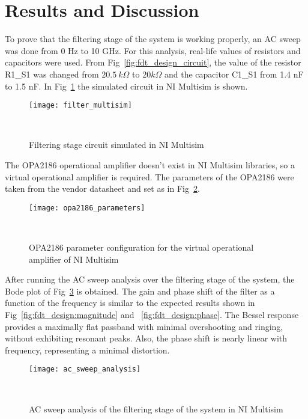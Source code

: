 \section{Results and Discussion}
\label{sec:results_and_discussion}
\hspace{8pt}
To prove that the filtering stage of the system is working properly, an AC sweep was done from 0 Hz to 10 GHz. For this analysis, real-life values of resistors and capacitors were used. From Fig~\ref{fig:fdt_design_circuit}, the value of the resistor R1\_S1 was changed from $20.5~k\Omega$ to $20 k\Omega$ and the capacitor C1\_S1 from 1.4 nF to 1.5 nF. In Fig~\ref{fig:filter_multisim} the simulated circuit in NI Multisim is shown.

\begin{figure}[H]
    \centering
    \texttt{[image: filter\_multisim]}
    \caption{Filtering stage circuit simulated in NI Multisim}
~\label{fig:filter_multisim}
\end{figure}

The OPA2186 operational amplifier doesn't exist in NI Multisim libraries, so a virtual operational amplifier is required. The parameters of the OPA2186 were taken from the vendor datasheet and set as in Fig~\ref{fig:opa2186_parameters}.

\begin{figure}[H]
    \centering
    \texttt{[image: opa2186\_parameters]}
    \caption{OPA2186 parameter configuration for the virtual operational amplifier of NI Multisim}
~\label{fig:opa2186_parameters}
\end{figure}

After running the AC sweep analysis over the filtering stage of the system, the Bode plot of Fig~\ref{fig:ac_sweep_analysis} is obtained. The gain and phase shift of the filter as a function of the frequency is similar to the expected results shown in Fig~\ref{fig:fdt_design:magnitude} and ~\ref{fig:fdt_design:phase}. The Bessel response provides a maximally flat passband with minimal overshooting and ringing, without exhibiting resonant peaks. Also, the phase shift is nearly linear with frequency, representing a minimal distortion.

\begin{figure}[H]
    \centering
    \texttt{[image: ac\_sweep\_analysis]}
    \caption{AC sweep analysis of the filtering stage of the system in NI Multisim}
~\label{fig:ac_sweep_analysis}
\end{figure}

